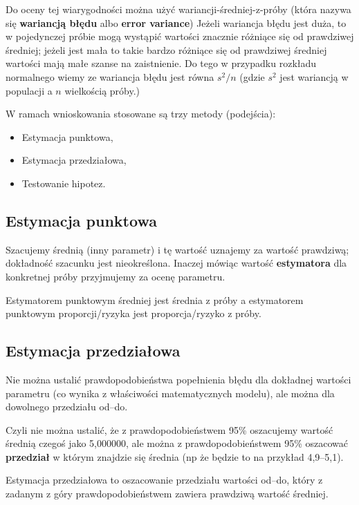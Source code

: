 \documentclass[
  openany]{book}
\begin{document}
Do oceny tej wiarygodności można użyć wariancji-średniej-z-próby (która nazywa się
\textbf{wariancją błędu} albo \textbf{error variance})
Jeżeli wariancja błędu jest duża, to w pojedynczej próbie mogą wystąpić wartości
znacznie różniące się od prawdziwej średniej; jeżeli jest mała to takie bardzo różniące
się od prawdziwej średniej wartości mają małe szanse na zaistnienie. Do tego w przypadku rozkładu
normalnego wiemy ze wariancja błędu jest równa \(s^2/n\)
(gdzie \(s^2\) jest wariancją w populacji a \(n\) wielkością próby.)

W ramach wnioskowania stosowane są trzy metody (podejścia):

\begin{itemize}
\item
  Estymacja punktowa,
\item
  Estymacja przedziałowa,
\item
  Testowanie hipotez.
\end{itemize}

\hypertarget{estymacja-punktowa}{%
\subsection{Estymacja punktowa}\label{estymacja-punktowa}}

Szacujemy średnią (inny parametr) i tę wartość uznajemy za wartość prawdziwą;
dokładność szacunku jest nieokreślona. Inaczej mówiąc wartość \textbf{estymatora}
dla konkretnej próby przyjmujemy za ocenę parametru.

Estymatorem punktowym średniej jest średnia z próby a estymatorem
punktowym proporcji/ryzyka jest proporcja/ryzyko z próby.

\hypertarget{estymacja-przedziaux142owa}{%
\subsection{Estymacja przedziałowa}\label{estymacja-przedziaux142owa}}

Nie można ustalić prawdopodobieństwa popełnienia
błędu dla dokładnej wartości parametru (co wynika z właściwości matematycznych
modelu), ale można dla dowolnego przedziału od--do.

Czyli nie można ustalić, że z prawdopodobieństwem 95\%
oszacujemy wartość średnią czegoś jako 5,000000,
ale można z prawdopodobieństwem 95\% oszacować
\textbf{przedział} w którym znajdzie się średnia (np że będzie to na przykład 4,9--5,1).

Estymacja przedziałowa to oszacowanie przedziału wartości od--do,
który z zadanym z góry prawdopodobieństwem zawiera prawdziwą wartość średniej.
\end{document}
